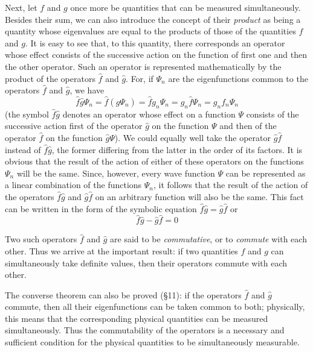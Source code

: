 Next, let $ f $ and $ g $ once more be quantities that can be measured simultaneously. Besides their sum, we can also introduce the concept of their \textit{product} as being a quantity whose eigenvalues are equal to the products of those of the quantities $ f $ and $ g $. It is easy to see that, to this quantity, there corresponds an operator whose effect consists of the successive action on the function of first one and then the other operator. Such an operator is represented mathematically by the product of the operators $ \hat{f} $ and $ \hat{g} $. For, if $ \Psi_n $ are the eigenfunctions common to the operators $ \hat{f} $ and $ \hat{g} $, we have
\[ \hat{f}\hat{g}\Psi_n=\hat{f}(\hat{g}\Psi_n)=\hat{f}g_n\Psi_n=g_n\hat{f}\Psi_n=g_nf_n\Psi_n \]
(the symbol $ \hat{f}\hat{g} $ denotes an operator whose effect on a function $ \Psi $ consists of the successive action first of the operator $ \hat{g} $ on the function $ \Psi $ and then of the operator $ \hat{f} $ on the function $ \hat{g}\Psi $). We could equally well take the operator $ \hat{g}\hat{f} $ instead of $\hat{f}\hat{g} $, the former differing from the latter in the order of its factors. It is obvious that the result of the action of either of these operators on the functions $ \Psi_n $ will be the same. Since, however, every wave function $ \Psi $ can be represented as a linear combination of the functions $ \Psi_n $, it follows that the result of the action of the operators $ \hat{f}\hat{g} $ and $ \hat{g}\hat{f} $ on an arbitrary function will also be the same. This fact can be written in the form of the symbolic equation $ \hat{f}\hat{g}=\hat{g}\hat{f} $ or
\begin{equation}\label{4.3}
\hat{f}\hat{g}-\hat{g}\hat{f}=0
\end{equation}

Two such operators $ \hat{f} $ and $ \hat{g} $ are said to be \textit{commutative}, or to \textit{commute} with each other. Thus we arrive at the important result: if two quantities $ f $ and $ g $ can simultaneously take definite values, then their operators commute with each other.

The converse theorem can also be proved (§11): if the operators $ \hat{f} $ and $ \hat{g} $ commute, then all their eigenfunctions can be taken common to both; physically, this means that the corresponding physical quantities can be measured simultaneously. Thus the commutability of the operators is a necessary and sufficient condition for the physical quantities to be simultaneously measurable.

